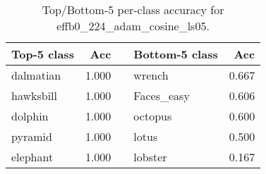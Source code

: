 \begin{table}[h]
  \centering
  \begin{tabular}{l r c l r}
    \toprule
    \textbf{Top-5 class} & \textbf{Acc} & & \textbf{Bottom-5 class} & \textbf{Acc}\\
    \midrule
    dalmatian & 1.000 & & wrench & 0.667\\
    hawksbill & 1.000 & & Faces_easy & 0.606\\
    dolphin & 1.000 & & octopus & 0.600\\
    pyramid & 1.000 & & lotus & 0.500\\
    elephant & 1.000 & & lobster & 0.167\\
    \bottomrule
  \end{tabular}
  \caption{Top/Bottom-5 per-class accuracy for effb0_224_adam_cosine_ls05.}
  \label{tab:perclass_effb0_224_adam_cosine_ls05}
\end{table}